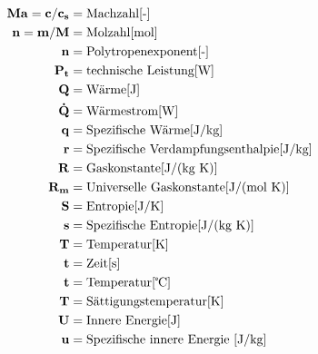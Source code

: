 \documentclass[twocolumn]{article}
\begin{document}
\begin{align*}
	\mathbf{Ma=c/c_s}	&=	\text{Machzahl[-]} \\
	\mathbf{n=m/M}		&=	\text{Molzahl[mol]} \\
	\mathbf{n}		&=	\text{Polytropenexponent[-]} \\
	\mathbf{P_t}		&=	\text{technische Leistung[W]} \\
	\mathbf{Q}		&=	\text{Wärme[J]} \\
	\mathbf{\dot{Q}}	&=	\text{Wärmestrom[W]} \\
	\mathbf{q}		&=	\text{Spezifische Wärme[J/kg]} \\
	\mathbf{r}		&=	\text{Spezifische Verdampfungsenthalpie[J/kg]} \\
	\mathbf{R}		&=	\text{Gaskonstante[J/(kg K)]} \\
	\mathbf{R_m}		&=	\text{Universelle Gaskonstante[J/(mol K)]} \\
	\mathbf{S}		&=	\text{Entropie[J/K]} \\
	\mathbf{s}		&=	\text{Spezifische Entropie[J/(kg K)]} \\
	\mathbf{T}		&=	\text{Temperatur[K]} \\
	\mathbf{t}		&=	\text{Zeit[s]} \\
	\mathbf{t}		&=	\text{Temperatur[\textcelsius{}]} \\
	\mathbf{T}		&=	\text{Sättigungstemperatur[K]} \\
	\mathbf{U}		&=	\text{Innere Energie[J]} \\
	\mathbf{u}		&=	\text{Spezifische innere Energie [J/kg]} \\
\end{align*}
\\\\\\\\
\end{document}
